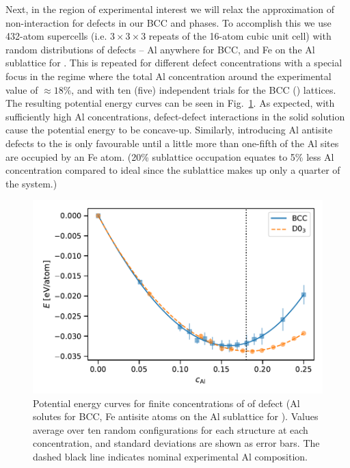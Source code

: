 Next, in the region of experimental interest we will relax the approximation of non-interaction for defects in our BCC and \DOTHREE phases.
To accomplish this we use 432-atom supercells (i.e. $3\times3\times3$ repeats of the 16-atom cubic \DOTHREE unit cell) with random distributions of defects -- Al anywhere for BCC, and Fe on the Al sublattice for \DOTHREE.
This is repeated for different defect concentrations with a special focus in the regime where the total Al concentration around the experimental value of $\approx 18\%$, and with ten (five) independent trials for the BCC (\DOTHREE) lattices.
The resulting potential energy curves can be seen in Fig.~\ref{fig:0K_interacting_potential}.
As expected, with sufficiently high Al concentrations, defect-defect interactions in the solid solution cause the potential energy to be concave-up.
Similarly, introducing Al antisite defects to the \DOTHREE is only favourable until a little more than one-fifth of the Al sites are occupied by an Fe atom. (20\% sublattice occupation equates to 5\% less Al concentration compared to ideal \DOTHREE since the sublattice makes up only a quarter of the system.)
%
\begin{figure}[h]
    \label{fig:0K_interacting_potential}
    \centering
    \includegraphics[width=\textwidth]{figures/zerok_interacting_defect_potential}
    \caption{Potential energy curves for finite concentrations of of defect (Al solutes for BCC, Fe antisite atoms on the Al sublattice for \DOTHREE). Values average over ten random configurations for each structure at each concentration, and standard deviations are shown as error bars. The dashed black line indicates nominal experimental Al composition.}
\end{figure}
%


